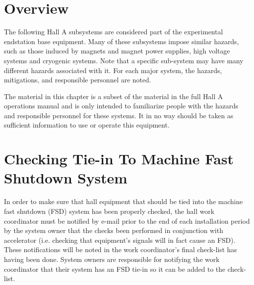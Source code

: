 \section{Overview}

        The following Hall A subsystems are considered part of the experimental endstation base equipment.
Many of these subsystems impose similar hazards, such as those induced by magnets and magnet power supplies,
high voltage systems and cryogenic systems.  Note that a specific sub-system may have many different hazards associated with it.
For each major system, the hazards, mitigations, and responsible personnel are noted.

The material in this chapter is a subset of the material in the full Hall A operations manual and is only intended to familiarize
people with the hazards and responsible personnel for these systems.  It in no way should be taken as sufficient information to
use or operate this equipment.

\section{Checking Tie-in To Machine Fast Shutdown System}

In order to make sure that hall equipment that should be tied into the machine fast shutdown (FSD) system
has been properly checked, the hall work coordinator must be notified by e-mail prior to the end of each
installation period by the system owner
that the checks been performed in conjunction with accelerator (i.e. checking that equipment's signals
will in fact cause an FSD).  These notifications will be
noted in the work coordinator's final check-list has having been done.   System owners are responsible
for notifying the work coordinator that their system has an FSD tie-in so it can be added to the check-list.


%
%

